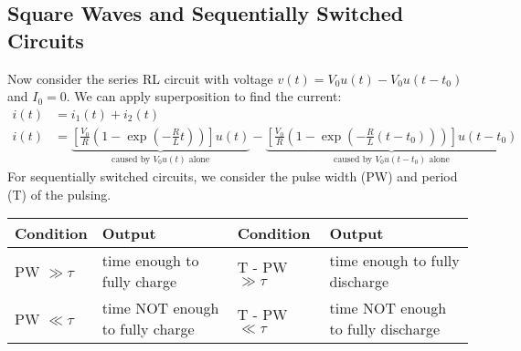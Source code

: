 \documentclass[a4paper,11pt]{article}
\begin{document}
	\subsection{Square Waves and Sequentially Switched Circuits}
	Now consider the series RL circuit with voltage $v(t) = V_0u(t) - V_0u(t - t_0)$ and $I_0 = 0$. We can apply superposition to find the current:
	\begin{align*}
		i(t) &= i_1(t) + i_2(t) \\ 
		i(t) &= \underbrace{\left[\frac{V_0}{R} \left( 1 - \exp \left( -\frac{R}{L}t \right) \right) \right]u(t)}_\text{caused by $V_0u(t)$ alone} - \underbrace{\left[\frac{V_0}{R} \left(1 - \exp \left( -\frac{R}{L}(t - t_0) \right) \right) \right]u(t - t_0)}_\text{caused by $V_0u(t - t_0)$ alone}
	\end{align*}
	For sequentially switched circuits, we consider the pulse width (PW) and period (T) of the pulsing. 
	\begin{center}
	\begin{tabular}{|l|l|l|l|}
		\hline
		Condition & Output & Condition & Output \\ \hline
		PW $\gg \tau$ & time enough to fully charge & T - PW $\gg \tau$ & time enough to fully discharge \\ \hline
		PW $\ll \tau$ & time NOT enough to fully charge & T - PW $\ll \tau$ & time NOT enough to fully discharge \\ \hline
	\end{tabular}
	\end{center}
	
\end{document}

